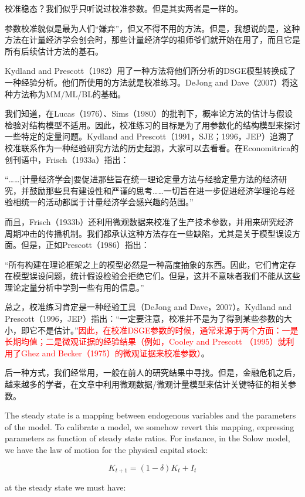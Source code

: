\documentclass[cn,10pt,math=newtx,citestyle=gb7714-2015,bibstyle=gb7714-2015]{elegantbook}
\begin{document}
	校准稳态？我们似乎只听说过校准参数。但是其实两者是一样的。
	
	参数校准貌似是最为人们“嫌弃”，但又不得不用的方法。但是，我想说的是，这种方法在计量经济学会创会时，那些计量经济学的祖师爷们就开始在用了，而且它是所有后续估计方法的基石。
	
	Kydland and Prescott（1982）用了一种方法将他们所分析的DSGE模型转换成了一种经验分析。他们所使用的方法就是校准练习。DeJong and Dave（2007）将这种方法称为MM/ML/BL的基础。
	
	我们知道，在Lucas（1976）、Sims（1980）的批判下，概率论方法的估计与假设检验对结构模型不适用。因此，校准练习的目标是为了用参数化的结构模型来探讨一些特定的定量问题。Kydland and Prescott（1991，SJE；1996，JEP）追溯了校准联系作为一种经验研究方法的历史起源，大家可以去看看。在Economitrica的创刊语中，Frisch（1933a）指出：
	
	“……[计量经济学会]要促进那些旨在统一理论定量方法与经验定量方法的经济研究，并鼓励那些具有建设性和严谨的思考……一切旨在进一步促进经济学理论与经验相统一的活动都属于计量经济学会感兴趣的范围。”
	
	而且，Frisch（1933b）还利用微观数据来校准了生产技术参数，并用来研究经济周期冲击的传播机制。我们都承认这种方法存在一些缺陷，尤其是关于模型误设方面。但是，正如Prescott（1986）指出：
	
	“所有构建在理论框架之上的模型必然是一种高度抽象的东西。因此，它们肯定存在模型误设问题，统计假设检验会拒绝它们。但是，这并不意味者我们不能从这些理论定量分析中学到一些有用的信息。”
	
	总之，校准练习肯定是一种经验工具（DeJong and Dave，2007）。Kydland and Prescott（1996，JEP）指出：“一定要注意，校准并不是为了得到某些参数的大小，即它不是估计。”\textcolor{red}{因此，在校准DSGE参数的时候，通常来源于两个方面：一是长期均值；二是微观证据的经验结果（例如，Cooley and Prescott （1995）就利用了Ghez and Becker（1975）的微观证据来校准参数）}。
	
	后一种方式，我们经常用，一般在前人的研究结果中寻找。但是，金融危机之后，越来越多的学者，在文章中利用微观数据/微观计量模型来估计关键特征的相关参数。
	
	The steady state is a mapping between endogenous variables and the parameters of the model. To calibrate a model, we somehow revert this mapping, expressing parameters as function of steady state ratios. For instance, in the Solow model, we have the law of motion for the physical capital stock:
	
	$$K_{t+1}=(1-\delta)K_t+I_t$$
	
	at the steady state we must have:
	
\end{document}
